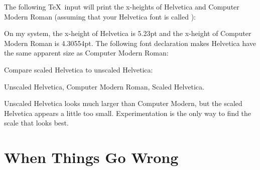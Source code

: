 \begin{shortexample}
\def\showxheight#1{%
  \font\fontfoo=#1 at 10pt%
  \message{The x-height of #1 at 10pt is \the\fontdimen5\fontfoo}}
\end{shortexample}

The following \TeX\ input will print the x-heights of
Helvetica and Computer Modern Roman (assuming that your Helvetica font
is called ):

\begin{shortexample}

\bye
\end{shortexample}

On my system, the x-height of Helvetica is 5.23pt and the x-height of
Computer Modern Roman is 4.30554pt.  The following font declaration
makes Helvetica have the same apparent size as Computer Modern Roman:

\begin{shortexample}
\end{shortexample}

Compare scaled Helvetica to unscaled Helvetica:

{%

\begin{exindent}
  \rm{}\selectfont
  Unscaled Helvetica, 
  \selectfont
  Computer Modern Roman,
  \selectfont
  Scaled Helvetica.
\end{exindent}%
}

Unscaled Helvetica looks much larger than Computer Modern, but the scaled
Helvetica appears a little too small.  Experimentation is the only way to find
the scale that looks best.

\section{When Things Go Wrong}

